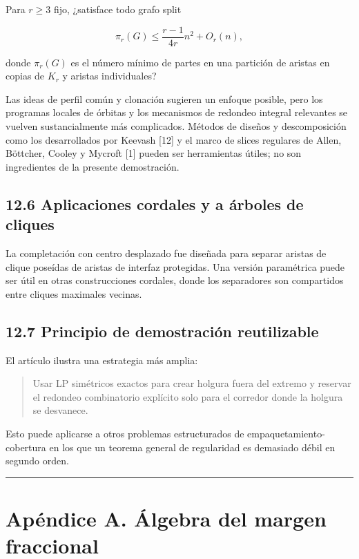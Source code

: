 \documentclass[spanish,11pt,a4paper]{article}
\begin{document}
Para \(r\ge3\) fijo, ¿satisface todo grafo split

\[
\pi_r(G)
\le
\frac{r-1}{4r}n^2+O_r(n),
\]

donde \(\pi_r(G)\) es el número mínimo de partes en una partición de
aristas en copias de \(K_r\) y aristas individuales?

Las ideas de perfil común y clonación sugieren un enfoque posible, pero
los programas locales de órbitas y los mecanismos de redondeo integral
relevantes se vuelven sustancialmente más complicados. Métodos de
diseños y descomposición como los desarrollados por Keevash {[}12{]} y
el marco de slices regulares de Allen, Böttcher, Cooley y Mycroft
{[}1{]} pueden ser herramientas útiles; no son ingredientes de la
presente demostración.

\subsection{12.6 Aplicaciones cordales y a árboles de
cliques}\label{aplicaciones-cordales-y-a-uxe1rboles-de-cliques}

La completación con centro desplazado fue diseñada para separar aristas
de clique poseídas de aristas de interfaz protegidas. Una versión
paramétrica puede ser útil en otras construcciones cordales, donde los
separadores son compartidos entre cliques maximales vecinas.

\subsection{12.7 Principio de demostración
reutilizable}\label{principio-de-demostraciuxf3n-reutilizable}

El artículo ilustra una estrategia más amplia:

\begin{quote}
Usar LP simétricos exactos para crear holgura fuera del extremo y
reservar el redondeo combinatorio explícito solo para el corredor donde
la holgura se desvanece.
\end{quote}

Esto puede aplicarse a otros problemas estructurados de
empaquetamiento-cobertura en los que un teorema general de regularidad
es demasiado débil en segundo orden.

\begin{center}\rule{0.5\linewidth}{0.5pt}\end{center}

\section{Apéndice A. Álgebra del margen
fraccional}\label{apuxe9ndice-a.-uxe1lgebra-del-margen-fraccional}
\end{document}
